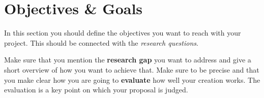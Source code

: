 \section{Objectives \& Goals}
\label{sec:objectives_and_goals}

In this section you should define the objectives you want to reach with your project. This should be connected with the \textit{research questions}.

Make sure that you mention the \textbf{research gap} you want to address and give a short overview of how you want to achieve that. Make sure to be precise and that you make clear how you are going to \textbf{evaluate} how well your creation works. The evaluation is a key point on which your proposal is judged. 